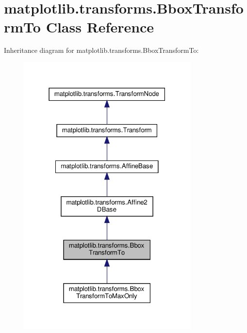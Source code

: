 \hypertarget{classmatplotlib_1_1transforms_1_1BboxTransformTo}{}\section{matplotlib.\+transforms.\+Bbox\+Transform\+To Class Reference}
\label{classmatplotlib_1_1transforms_1_1BboxTransformTo}


Inheritance diagram for matplotlib.\+transforms.\+Bbox\+Transform\+To\+:
\nopagebreak
\begin{figure}[H]
\begin{center}
\leavevmode
\includegraphics[width=259pt]{classmatplotlib_1_1transforms_1_1BboxTransformTo__inherit__graph}
\end{center}
\end{figure}


